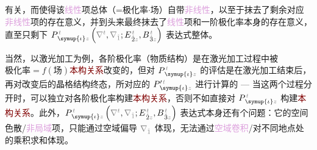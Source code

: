 有关，而使得该\textcolor{Plum}{线性}项总体（=极化率$\cdot$场）自带\textcolor{Plum}{非线性}，以至于抹去了剩余对应\textcolor{Plum}{非线性}项的存在意义，并到头来最终抹去了\textcolor{Plum}{线性}项和一阶极化率本身的存在意义\cite{boydNonlinearOptics2019}，直至只剩下 $P^{\;\!\mathcolor{gray}{t}}_{\;\! \symup{\iota}\mathcolor{gray}{z}} \left( \mathcolor{gray}{\nabla^t}, \mathcolor{gray}{\nabla_{\hat{1}}} ; E^{\;\!\mathcolor{gray}{t}}_{\;\! \hat{2}\mathcolor{gray}{z}}, B^{\;\!\mathcolor{gray}{t}}_{\;\! \hat{3}\mathcolor{gray}{z}} \right)$ 表达式整体。

当然，以激光加工为例，各阶极化率（物质结构）是在激光加工过程中被$\text{极化率} = f(\text{场})$\textcolor{Maroon}{本构关系}改变的，但对 $P^{\;\!\mathcolor{gray}{t}}_{\;\! \symup{\iota}\mathcolor{gray}{z}}$ 的评估是在激光加工结束后，再对改变后的晶格结构终态，所对应的 $P'^{\;\!\mathcolor{gray}{t}}_{\;\! \symup{\iota}\mathcolor{gray}{z}}$ 进行计算的 --- 当这两个过程分开时，可以独立对各阶极化率构建\textcolor{Maroon}{本构关系}，否则不如直接对 $P^{\;\!\mathcolor{gray}{t}}_{\;\! \symup{\iota}\mathcolor{gray}{z}}$ 构建\textcolor{Maroon}{本构关系}。此外，$P^{\;\!\mathcolor{gray}{t}}_{\;\! \symup{\iota}\mathcolor{gray}{z}} \left( \mathcolor{gray}{\nabla^t}, \mathcolor{gray}{\nabla_{\hat{1}}} ; E^{\;\!\mathcolor{gray}{t}}_{\;\! \hat{2}\mathcolor{gray}{z}}, B^{\;\!\mathcolor{gray}{t}}_{\;\! \hat{3}\mathcolor{gray}{z}} \right)$ 表达式本身还有个问题：它的空间\textcolor{NavyBlue}{色散}/\textcolor{Plum}{非局域}项，只能通过空域偏导 $\mathcolor{gray}{\nabla_{\hat{1}}}$ 体现，无法通过\textcolor{Plum}{空域卷积}/对不同地点处的乘积求和体现。


